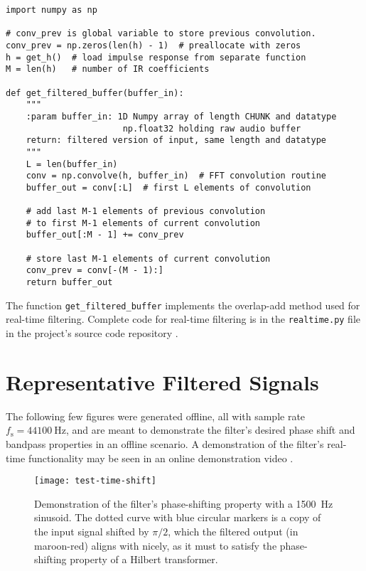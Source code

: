 \begin{listing}
\begin{verbatim}
import numpy as np

# conv_prev is global variable to store previous convolution.
conv_prev = np.zeros(len(h) - 1)  # preallocate with zeros
h = get_h()  # load impulse response from separate function
M = len(h)   # number of IR coefficients

def get_filtered_buffer(buffer_in):
    """
    :param buffer_in: 1D Numpy array of length CHUNK and datatype 
                       np.float32 holding raw audio buffer
    return: filtered version of input, same length and datatype
    """
    L = len(buffer_in)
    conv = np.convolve(h, buffer_in)  # FFT convolution routine
    buffer_out = conv[:L]  # first L elements of convolution

    # add last M-1 elements of previous convolution
    # to first M-1 elements of current convolution
    buffer_out[:M - 1] += conv_prev
    
    # store last M-1 elements of current convolution
    conv_prev = conv[-(M - 1):]
    return buffer_out
\end{verbatim}
    \vspace{-1ex}
    \caption{The function \texttt{get\_filtered\_buffer} implements the overlap-add method used for real-time filtering. Complete code for real-time filtering is in the \texttt{realtime.py} file in the project's source code repository .}
    \label{code:filter}
\end{listing}


\section{Representative Filtered Signals}
The following few figures were generated offline, all with sample rate $ f_{\mathrm{s}} = \SI{44100}{\hertz} $, and are meant to demonstrate the filter's desired phase shift and bandpass properties in an offline scenario.
A demonstration of the filter's real-time functionality may be seen in an online demonstration video .

\begin{figure}[htb!]
	\centering
	\texttt{[image: test-time-shift]}
    \vspace{-3ex}
	\caption{Demonstration of the filter's phase-shifting property with a \SI{1500}{\hertz} sinusoid. 
    The dotted curve with blue circular markers is a copy of the input signal shifted by $ \pi/2 $, which the filtered output (in maroon-red) aligns with nicely, as it must to satisfy the phase-shifting property of a Hilbert transformer.}
	\label{fig:phase}
\end{figure}


